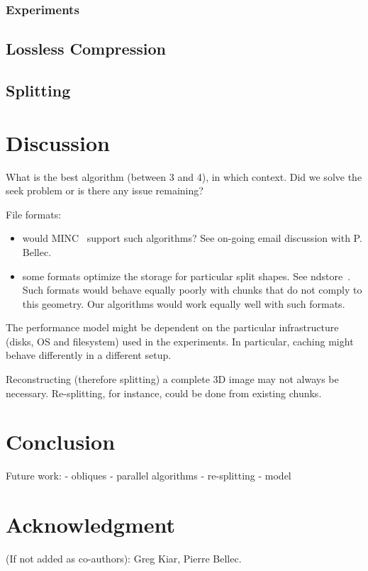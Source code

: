 \documentclass[10pt, conference, compsocconf]{IEEEtran}
\begin{document}
\subsubsection{Experiments}

\subsection{Lossless Compression}

\subsection{Splitting}

\newpage

\section{Discussion}
\label{sec:discussion}

What is the best algorithm (between 3 and 4), in which context. Did we
solve the seek problem or is there any issue remaining?

File formats:
\begin{itemize}
\item would MINC~\cite{vincent2016minc} support such algorithms? See on-going email discussion
with P. Bellec.
\item some formats optimize the storage for particular split shapes. See
  ndstore~\cite{burns2013open}. Such formats would behave equally
  poorly with chunks that do not comply to this geometry. Our
  algorithms would work equally well with such formats.
\end{itemize}

The performance model might be dependent on the particular
infrastructure (disks, OS and filesystem) used in the experiments. In
particular, caching might behave differently in a different setup.

Reconstructing (therefore splitting) a complete 3D image may not
always be necessary. Re-splitting, for instance, could be done from
existing chunks.

\section{Conclusion}

Future work:
- obliques
- parallel algorithms
- re-splitting
- model

\section*{Acknowledgment}

(If not added as co-authors): Greg Kiar, Pierre Bellec.



\end{document}
